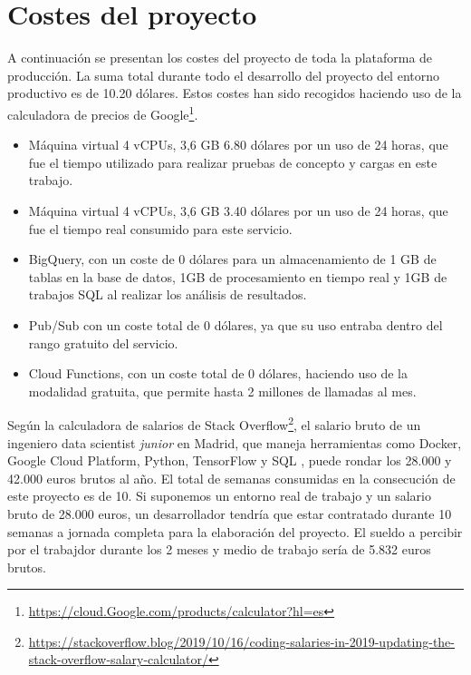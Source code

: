 \section{Costes del proyecto}\label{sec:costes-del-proyecto}
A continuación se presentan los costes del proyecto de toda la plataforma de producción.
La suma total durante todo el desarrollo del proyecto del entorno productivo es de 10.20 dólares.
Estos costes han sido recogidos haciendo uso de la calculadora de precios de Google\footnote{\url{https://cloud.Google.com/products/calculator?hl=es}}.

\begin{itemize}
    \item Máquina virtual 4 vCPUs, 3,6 GB 6.80 dólares por un uso de 24 horas, que fue el tiempo utilizado para realizar pruebas de concepto y cargas en este trabajo.
    \item Máquina virtual 4 vCPUs, 3,6 GB 3.40 dólares por un uso de 24 horas, que fue el tiempo real consumido para este servicio.
    \item BigQuery, con un coste de 0 dólares para un almacenamiento de 1 GB de tablas en la base de datos, 1GB de procesamiento en tiempo real y 1GB de trabajos SQL al realizar los análisis de resultados.
    \item Pub/Sub con un coste total de 0 dólares, ya que su uso entraba dentro del rango gratuito del servicio.
    \item Cloud Functions, con un coste total de 0 dólares, haciendo uso de la modalidad gratuita, que permite hasta 2 millones de llamadas al mes.
\end{itemize}

Según la calculadora de salarios de Stack Overflow\footnote{\url{https://stackoverflow.blog/2019/10/16/coding-salaries-in-2019-updating-the-stack-overflow-salary-calculator/}}, el salario bruto de un ingeniero {data scientist} \textit{junior} en Madrid, que maneja herramientas como Docker, Google Cloud Platform, Python, TensorFlow y SQL , puede rondar los 28.000 y 42.000 euros brutos al año.
El total de semanas consumidas en la consecución de este proyecto es de 10.
Si suponemos un entorno real de trabajo y un salario bruto de 28.000 euros, un desarrollador tendría que estar contratado durante 10 semanas a jornada completa para la elaboración del proyecto.
El sueldo a percibir por el trabajdor durante los 2 meses y medio de trabajo sería de 5.832 euros brutos.
